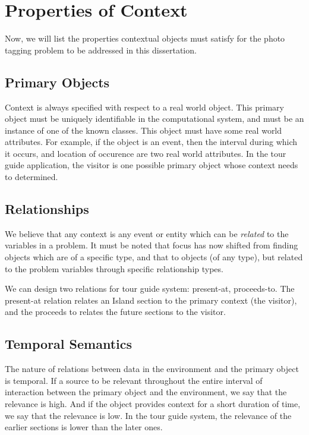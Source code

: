 \section{Properties of Context}

Now, we will list the properties contextual objects must satisfy for the photo tagging problem to be addressed in this dissertation.

\subsection{Primary Objects}

Context is always specified with respect to a real world object. This primary object must be uniquely identifiable in the computational system, and must be an instance of one of the known classes. This object must have some real world attributes. For example, if the object is an event, then the interval during which it occurs, and location of occurence are two real world attributes. In the tour guide application, the visitor is one possible primary object whose context needs to determined.

\subsection{Relationships}
We believe that any context is any event or entity which can be \textit{related} to the variables in a problem. It must be noted that focus has now shifted from finding objects which are of a specific type, and that to objects (of any type), but related to the problem variables through specific relationship types.

We can design two relations for tour guide system: present-at, proceeds-to. The present-at relation relates an Island section to the primary context (the visitor), and the proceeds to relates the future sections to the visitor. 

\subsection{Temporal Semantics}
The nature of relations between data in the environment and the primary object is temporal. If a source to be relevant throughout the entire interval of interaction between the primary object and the environment, we say that the relevance is high. And if the object provides context for a short duration of time, we say that the relevance is low. In the tour guide system, the relevance of the earlier sections is lower than the later ones.

